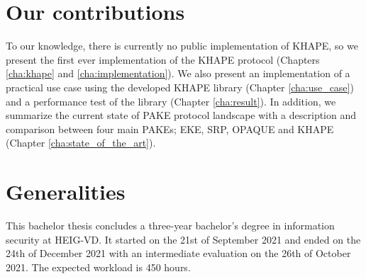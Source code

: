 ﻿\documentclass[../report.tex]{subfiles}
\begin{document}
\section{Our contributions}
To our knowledge, there is currently no public implementation of KHAPE, so we present the first ever implementation of the KHAPE protocol (Chapters \ref{cha:khape} and \ref{cha:implementation}).
We also present an implementation of a practical use case using the developed KHAPE library (Chapter \ref{cha:use_case}) and a performance test of the library (Chapter \ref{cha:result}).
In addition, we summarize the current state of PAKE protocol landscape with a description and comparison between four main PAKEs; EKE, SRP, OPAQUE and KHAPE (Chapter \ref{cha:state_of_the_art}).

\section{Generalities}
This bachelor thesis concludes a three-year bachelor’s degree in information security at HEIG-VD.
It started on the 21st of September 2021 and ended on the 24th of December 2021 with an intermediate evaluation on the 26th of October 2021. The expected workload is 450 hours.
\end{document}
